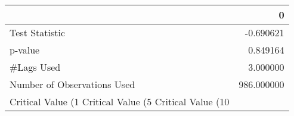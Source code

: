 \begin{tabular}{lr}
\toprule
 & 0 \\
\midrule
Test Statistic & -0.690621 \\
p-value & 0.849164 \\
#Lags Used & 3.000000 \\
Number of Observations Used & 986.000000 \\
Critical Value (1%
Critical Value (5%
Critical Value (10%
\bottomrule
\end{tabular}
